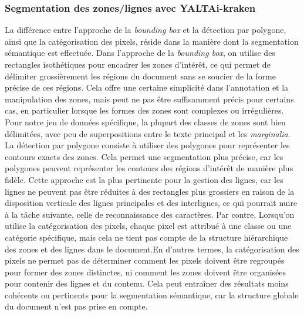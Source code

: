 \documentclass[a4paper, twoside, 12pt]{book}
\begin{document}
\subsubsection{Segmentation des zones/lignes avec YALTAi-kraken}

La différence entre l'approche de la \textit{bounding box} et la détection par polygone, ainsi que la catégorisation des pixels, réside dans la manière dont la segmentation sémantique est effectuée. Dans l'approche de la \textit{bounding box}, on utilise des rectangles isothétiques pour encadrer les zones d'intérêt, ce qui permet de délimiter grossièrement les régions du document sans se soucier de la forme précise de ces régions. Cela offre une certaine simplicité dans l'annotation et la manipulation des zones, mais peut ne pas être suffisamment précis pour certains cas, en particulier lorsque les formes des zones sont complexes ou irrégulières. Pour notre jeu de données spécifique, la plupart des classes de zones sont bien délimitées, avec peu de superpositions entre le texte principal et les \textit{marginalia}. \\

La détection par polygone consiste à utiliser des polygones pour représenter les contours exacts des zones. Cela permet une segmentation plus précise, car les polygones peuvent représenter les contours des régions d'intérêt de manière plus fidèle. Cette approche est la plus pertinente pour la gestion des lignes, car les lignes ne peuvent pas être réduites à des rectangles plus grossiers en raison de la disposition verticale des lignes principales et des interlignes, ce qui pourrait nuire à la tâche suivante, celle de reconnaissance des caractères.
Par contre, Lorsqu'on utilise la catégorisation des pixels, chaque pixel est attribué à une classe ou une catégorie spécifique, mais cela ne tient pas compte de la structure hiérarchique des zones et des lignes dans le document.En d'autres termes, la catégorisation des pixels ne permet pas de déterminer comment les pixels doivent être regroupés pour former des zones distinctes, ni comment les zones doivent être organisées pour contenir des lignes et du contenu. Cela peut entraîner des résultats moins cohérents ou pertinents pour la segmentation sémantique, car la structure globale du document n'est pas prise en compte.\\
\end{document}
